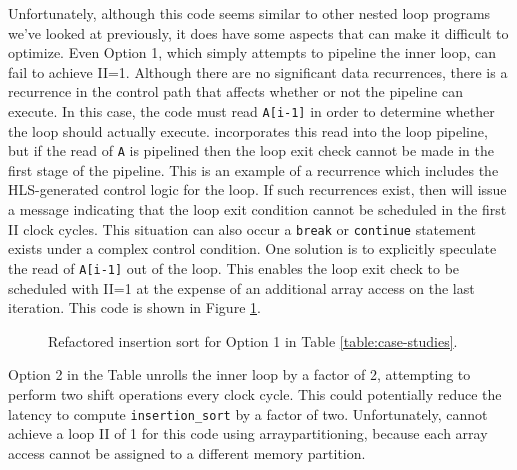 Unfortunately, although this code seems similar to other nested loop programs we've looked at previously, it does have some aspects that can make it difficult to optimize.  Even Option 1, which simply attempts to pipeline the inner loop, can fail to achieve II=1.  Although there are no significant data recurrences, there is a recurrence in the control path that affects whether or not the pipeline can execute.  In this case, the code must read \lstinline{A[i-1]} in order to determine whether the loop should actually execute.  \VHLS incorporates this read into the loop pipeline, but if the read of \lstinline{A} is pipelined then the loop exit check cannot be made in the first stage of the pipeline.  This is an example of a recurrence which includes the HLS-generated control logic for the loop.  If such recurrences exist, then \VHLS will issue a message indicating that the loop exit condition cannot be scheduled in the first II clock cycles.  This situation can also occur a \lstinline{break} or \lstinline{continue} statement exists under a complex control condition.  One solution is to explicitly speculate the read of \lstinline{A[i-1]} out of the loop.  This enables the loop exit check to be scheduled with II=1 at the expense of an additional array access on the last iteration.  This code is shown in Figure \ref{fig:insertion_sort_relaxed.cpp}.

\begin{figure}

\caption{Refactored insertion sort for Option 1 in Table \ref{table:case-studies}.}
\label{fig:insertion_sort_relaxed.cpp}
\end{figure}

Option 2 in the Table unrolls the inner loop by a factor of 2, attempting to perform two shift operations every clock cycle.  This could potentially reduce the latency to compute \lstinline{insertion_sort} by a factor of two.  Unfortunately, \VHLS cannot achieve a loop II of 1 for this code using \gls{arraypartitioning}, because each array access cannot be assigned to a different memory partition.


